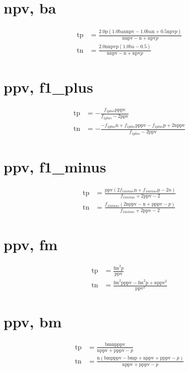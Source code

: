 \documentclass[3p,times]{elsarticle}
\begin{document}
\begin{footnotesize}
\begin{landscape}
\section{npv, ba}
\begin{align}
\mathrm{tp} &= \frac{2.0 \mathrm{p} \left(1.0 \mathrm{ba} \mathrm{n} \mathrm{npv} - 1.0 \mathrm{ba} \mathrm{n} + 0.5 \mathrm{npv} p\right)}{\mathrm{n} \mathrm{npv} - \mathrm{n} + \mathrm{npv} p}\\
\mathrm{tn} &= \frac{2.0 \mathrm{n} \mathrm{npv} \mathrm{p} \left(1.0 \mathrm{ba} - 0.5\right)}{\mathrm{n} \mathrm{npv} - \mathrm{n} + \mathrm{npv} p}
\end{align}
\section{ppv, f1_plus}
\begin{align}
\mathrm{tp} &= - \frac{f_{1 plus} \mathrm{p} \mathrm{ppv}}{f_{1 plus} - 2 \mathrm{ppv}}\\
\mathrm{tn} &= - \frac{- f_{1 plus} \mathrm{n} + f_{1 plus} \mathrm{p} \mathrm{ppv} - f_{1 plus} \mathrm{p} + 2 \mathrm{n} \mathrm{ppv}}{f_{1 plus} - 2 \mathrm{ppv}}
\end{align}
\section{ppv, f1_minus}
\begin{align}
\mathrm{tp} &= \frac{\mathrm{ppv} \left(2 f_{1 minus} \mathrm{n} + f_{1 minus} \mathrm{p} - 2 n\right)}{f_{1 minus} + 2 \mathrm{ppv} - 2}\\
\mathrm{tn} &= \frac{f_{1 minus} \left(2 \mathrm{n} \mathrm{ppv} - \mathrm{n} + \mathrm{p} \mathrm{ppv} - p\right)}{f_{1 minus} + 2 \mathrm{ppv} - 2}
\end{align}
\section{ppv, fm}
\begin{align}
\mathrm{tp} &= \frac{\mathrm{fm}^{2} p}{\mathrm{ppv}}\\
\mathrm{tn} &= \frac{\mathrm{fm}^{2} \mathrm{p} \mathrm{ppv} - \mathrm{fm}^{2} \mathrm{p} + \mathrm{n} \mathrm{ppv}^{2}}{\mathrm{ppv}^{2}}
\end{align}
\section{ppv, bm}
\begin{align}
\mathrm{tp} &= \frac{\mathrm{bm} \mathrm{n} \mathrm{p} \mathrm{ppv}}{\mathrm{n} \mathrm{ppv} + \mathrm{p} \mathrm{ppv} - p}\\
\mathrm{tn} &= \frac{\mathrm{n} \left(\mathrm{bm} \mathrm{p} \mathrm{ppv} - \mathrm{bm} \mathrm{p} + \mathrm{n} \mathrm{ppv} + \mathrm{p} \mathrm{ppv} - p\right)}{\mathrm{n} \mathrm{ppv} + \mathrm{p} \mathrm{ppv} - p}
\end{align}

\end{landscape}
\end{footnotesize}
\end{document}
